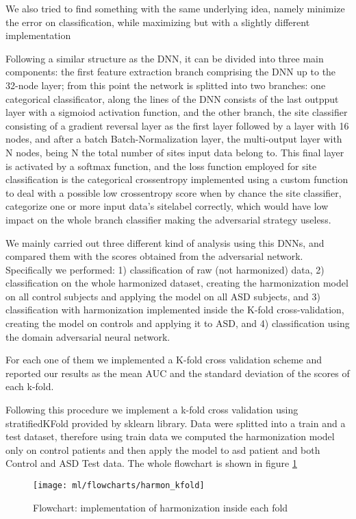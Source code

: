 \documentclass[a4paper,11pt]{article}
\begin{document}
We also tried to find something with the same underlying idea, namely minimize the error on classification, while maximizing but with a slightly different implementation


Following a similar structure as the DNN, it can be divided into three main components: the first feature extraction branch comprising the DNN up to the 32-node layer;
from this point the network is splitted into two branches: one categorical classificator, along the lines of the DNN consists of the last outpput layer with a sigmoiod activation function, and the other branch, the site classifier consisting of a gradient reversal layer as the first layer followed by a layer with 16 nodes, and after a batch Batch-Normalization layer, the multi-output layer with N nodes, being N the total number of sites input data belong to.
This final layer is activated by a softmax function, and the loss function employed for site classification is the categorical crossentropy implemented using a custom function to deal with a possible low crossentropy score when by chance the site classifier, categorize one or more input data's sitelabel correctly, which would have low impact on the whole branch classifier making the adversarial strategy useless.


We mainly carried out three different kind of analysis using this DNNs, and compared them with the scores obtained from the adversarial network.
Specifically we performed: 1) classification of raw (not harmonized) data, 2) classification on the whole harmonized dataset, creating the harmonization model on all control subjects and applying the model on all ASD subjects, and 3) classification with harmonization implemented inside the K-fold cross-validation, creating the model on controls and applying it to ASD, and 4) classification using the domain adversarial neural network.

For each one of them we implemented a K-fold cross validation scheme and reported our results as the mean AUC and the standard deviation of the scores of each k-fold.

Following this procedure we implement a k-fold cross validation using stratifiedKFold provided by sklearn library. Data were splitted into a train and a test dataset, therefore using train data we computed the harmonization model only on control patients and then apply the model to asd patient and both Control and ASD Test data.
The whole flowchart is shown in figure \ref{fig:harmon_kfold_flowchart}

\begin{figure}[h!]
\centering
\texttt{[image: ml/flowcharts/harmon\_kfold]}
\caption{Flowchart: implementation of harmonization inside each fold}
\label{fig:harmon_kfold_flowchart}
\end{figure}
\end{document}

